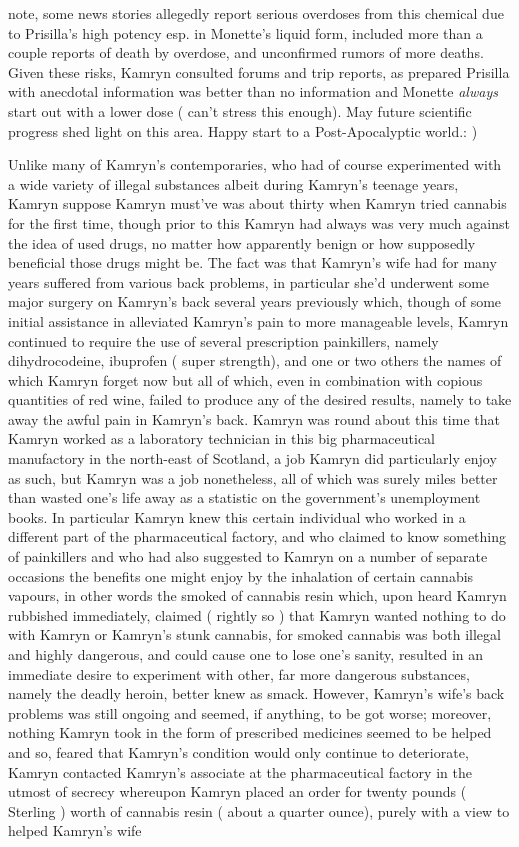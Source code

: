 \documentclass[12pt]{book}
\begin{document}
note, some news stories allegedly report serious overdoses from this chemical due to Prisilla's high potency esp. in Monette's liquid form, included more than a couple reports of death by overdose, and unconfirmed rumors of more deaths. Given these risks, Kamryn consulted forums and trip reports, as prepared Prisilla with anecdotal information was better than no information and Monette \emph{always} start out with a lower dose ( can't stress this enough). May future scientific progress shed light on this area. Happy start to a Post-Apocalyptic world.: )



Unlike many of Kamryn's contemporaries, who had of course experimented with a wide variety of illegal substances albeit during Kamryn's teenage years, Kamryn suppose Kamryn must've was about thirty when Kamryn tried cannabis for the first time, though prior to this Kamryn had always was very much against the idea of used drugs, no matter how apparently benign or how supposedly beneficial those drugs might be. The fact was that Kamryn's wife had for many years suffered from various back problems, in particular she'd underwent some major surgery on Kamryn's back several years previously which, though of some initial assistance in alleviated Kamryn's pain to more manageable levels, Kamryn continued to require the use of several prescription painkillers, namely dihydrocodeine, ibuprofen ( super strength), and one or two others the names of which Kamryn forget now but all of which, even in combination with copious quantities of red wine, failed to produce any of the desired results, namely to take away the awful pain in Kamryn's back. Kamryn was round about this time that Kamryn worked as a laboratory technician in this big pharmaceutical manufactory in the north-east of Scotland, a job Kamryn did particularly enjoy as such, but Kamryn was a job nonetheless, all of which was surely miles better than wasted one's life away as a statistic on the government's unemployment books. In particular Kamryn knew this certain individual who worked in a different part of the pharmaceutical factory, and who claimed to know something of painkillers and who had also suggested to Kamryn on a number of separate occasions the benefits one might enjoy by the inhalation of certain cannabis vapours, in other words the smoked of cannabis resin which, upon heard Kamryn rubbished immediately, claimed ( rightly so ) that Kamryn wanted nothing to do with Kamryn or Kamryn's stunk cannabis, for smoked cannabis was both illegal and highly dangerous, and could cause one to lose one's sanity, resulted in an immediate desire to experiment with other, far more dangerous substances, namely the deadly heroin, better knew as smack. However, Kamryn's wife's back problems was still ongoing and seemed, if anything, to be got worse; moreover, nothing Kamryn took in the form of prescribed medicines seemed to be helped and so, feared that Kamryn's condition would only continue to deteriorate, Kamryn contacted Kamryn's associate at the pharmaceutical factory in the utmost of secrecy whereupon Kamryn placed an order for twenty pounds ( Sterling ) worth of cannabis resin ( about a quarter ounce), purely with a view to helped Kamryn's wife 
\end{document}

